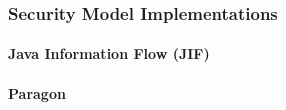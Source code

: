 \subsubsection{Security Model Implementations}

	\paragraph{Java Information Flow (JIF)}
	
	\cite{myers1999jif}
	
	\cite{pullicino2014jif}
	
	\cite{broberg2013paragon}
	
	\paragraph{Paragon}